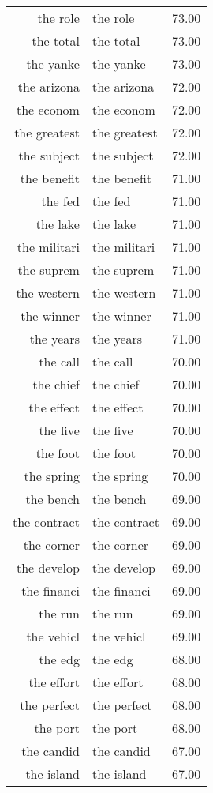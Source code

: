 \begin{table}[ht]
\begin{tabular}{rlr}
  the role & the role & 73.00 \\ 
  the total & the total & 73.00 \\ 
  the yanke & the yanke & 73.00 \\ 
  the arizona & the arizona & 72.00 \\ 
  the econom & the econom & 72.00 \\ 
  the greatest & the greatest & 72.00 \\ 
  the subject & the subject & 72.00 \\ 
  the benefit & the benefit & 71.00 \\ 
  the fed & the fed & 71.00 \\ 
  the lake & the lake & 71.00 \\ 
  the militari & the militari & 71.00 \\ 
  the suprem & the suprem & 71.00 \\ 
  the western & the western & 71.00 \\ 
  the winner & the winner & 71.00 \\ 
  the years & the years & 71.00 \\ 
  the call & the call & 70.00 \\ 
  the chief & the chief & 70.00 \\ 
  the effect & the effect & 70.00 \\ 
  the five & the five & 70.00 \\ 
  the foot & the foot & 70.00 \\ 
  the spring & the spring & 70.00 \\ 
  the bench & the bench & 69.00 \\ 
  the contract & the contract & 69.00 \\ 
  the corner & the corner & 69.00 \\ 
  the develop & the develop & 69.00 \\ 
  the financi & the financi & 69.00 \\ 
  the run & the run & 69.00 \\ 
  the vehicl & the vehicl & 69.00 \\ 
  the edg & the edg & 68.00 \\ 
  the effort & the effort & 68.00 \\ 
  the perfect & the perfect & 68.00 \\ 
  the port & the port & 68.00 \\ 
  the candid & the candid & 67.00 \\ 
  the island & the island & 67.00 \\ 

\end{tabular}
\end{table}
